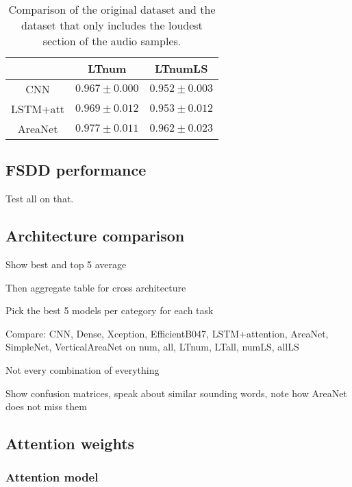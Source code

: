 \begin{table}[t!]
    \centering
    \caption{Comparison of the original dataset and the dataset that only
    includes the loudest section of the audio samples.}
    \label{tab:comparison_loud_section}
    \begin{tabular}{|c|c|c|}
        \hline
        & LTnum & LTnumLS \\
        \hline
        CNN      & $0.967 \pm 0.000$ & $0.952 \pm 0.003$ \\
        LSTM+att & $0.969 \pm 0.012$ & $0.953 \pm 0.012$ \\
        AreaNet  & $0.977 \pm 0.011$ & $0.962 \pm 0.023$ \\
        \hline
    \end{tabular}
\end{table}

\subsection{FSDD performance}

Test all on that.

\subsection{Architecture comparison}

Show best and top 5 average

Then aggregate table for cross architecture

Pick the best 5 models per category for each task

Compare: CNN, Dense, Xception, EfficientB047, LSTM+attention, AreaNet, SimpleNet,
VerticalAreaNet on num, all, LTnum, LTall, numLS, allLS

Not every combination of everything

Show confusion matrices, speak about similar sounding words, note how AreaNet
does not miss them

\subsection{Attention weights}

\subsubsection{Attention model}

